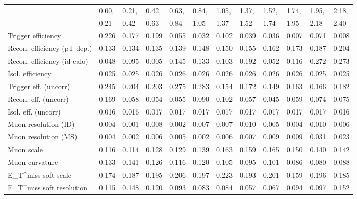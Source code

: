 \begin{tabular}{l|p{0.6cm}p{0.6cm}p{0.6cm}p{0.6cm}p{0.6cm}p{0.6cm}p{0.6cm}p{0.6cm}p{0.6cm}p{0.6cm}p{0.6cm}}
\hline
   & 0.00, & 0.21, & 0.42, & 0.63, & 0.84, & 1.05, & 1.37, & 1.52, & 1.74, & 1.95, & 2.18,  \\ 
   & 0.21 & 0.42 & 0.63 & 0.84 & 1.05 & 1.37 & 1.52 & 1.74 & 1.95 & 2.18 & 2.40  \\ 
\hline
Trigger efficiency                       & 0.226 & 0.177 & 0.199 & 0.055 & 0.032 & 0.102 & 0.039 & 0.036 & 0.007 & 0.071 & 0.008 \\
Recon. efficiency (pT dep.)              & 0.133 & 0.134 & 0.135 & 0.139 & 0.148 & 0.150 & 0.155 & 0.162 & 0.173 & 0.187 & 0.204 \\
Recon. efficiency (id-calo)              & 0.048 & 0.095 & 0.005 & 0.145 & 0.133 & 0.103 & 0.192 & 0.052 & 0.116 & 0.272 & 0.273 \\
Isol. efficiency                         & 0.025 & 0.025 & 0.026 & 0.026 & 0.026 & 0.026 & 0.026 & 0.026 & 0.026 & 0.025 & 0.025 \\
Trigger eff. (uncorr)                    & 0.245 & 0.204 & 0.203 & 0.275 & 0.283 & 0.154 & 0.172 & 0.149 & 0.163 & 0.166 & 0.182 \\
Recon. eff. (uncorr)                     & 0.169 & 0.058 & 0.054 & 0.055 & 0.090 & 0.102 & 0.057 & 0.045 & 0.059 & 0.074 & 0.075 \\
Isol. eff. (uncorr)                      & 0.016 & 0.016 & 0.017 & 0.017 & 0.017 & 0.017 & 0.017 & 0.017 & 0.017 & 0.017 & 0.016 \\
Muon resolution (ID)                     & 0.004 & 0.001 & 0.008 & 0.002 & 0.007 & 0.007 & 0.010 & 0.005 & 0.004 & 0.010 & 0.006 \\
Muon resolution (MS)                     & 0.004 & 0.002 & 0.006 & 0.005 & 0.002 & 0.006 & 0.007 & 0.009 & 0.009 & 0.031 & 0.023 \\
Muon scale                               & 0.116 & 0.114 & 0.128 & 0.129 & 0.139 & 0.163 & 0.159 & 0.165 & 0.150 & 0.140 & 0.142 \\
Muon curvature                           & 0.133 & 0.141 & 0.126 & 0.116 & 0.120 & 0.105 & 0.095 & 0.101 & 0.086 & 0.080 & 0.088 \\
E_{T}^{miss} soft scale                  & 0.174 & 0.187 & 0.195 & 0.206 & 0.197 & 0.223 & 0.193 & 0.201 & 0.159 & 0.196 & 0.185 \\
E_{T}^{miss} soft resolution             & 0.115 & 0.148 & 0.120 & 0.093 & 0.083 & 0.084 & 0.057 & 0.067 & 0.094 & 0.097 & 0.152 \\

\end{tabular}

